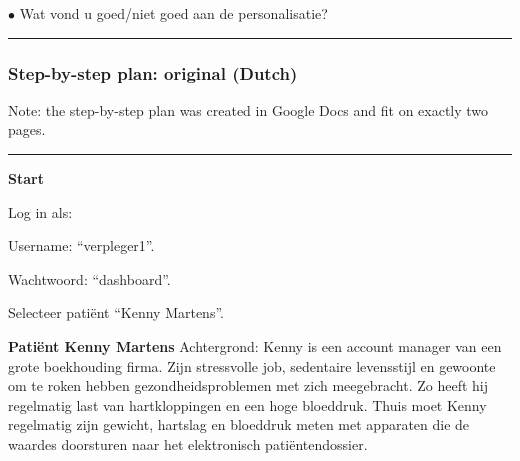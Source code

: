     \noindent \(\bullet\) Wat vond u goed/niet goed aan de personalisatie?\hspace{6pt}\rule{0.3\textwidth}{0.4pt}

    \subsubsection{Step-by-step plan: original (Dutch)}\label{appendix_test_steps}

    Note: the step-by-step plan was created in Google Docs and fit on exactly two pages.

    \vspace{6pt}
    \hrule
    \vspace{6pt}
    \noindent\textbf{Start}
    \vspace{-6pt}
    \begin{myenumerate}
        \item Log in als:
        \begin{myenumerate}
            \item Username: ``verpleger1''.
            \item Wachtwoord: ``dashboard''.
        \end{myenumerate}
        \item Selecteer pati\"{e}nt ``Kenny Martens''.
    \end{myenumerate}

    \noindent\textbf{Pati\"{e}nt Kenny Martens}\newline
    Achtergrond: Kenny is een account manager van een grote boekhouding firma. Zijn stressvolle job, sedentaire levensstijl en gewoonte om te roken hebben gezondheidsproblemen met zich meegebracht. Zo heeft hij regelmatig last van hartkloppingen en een hoge bloeddruk. Thuis moet Kenny regelmatig zijn gewicht, hartslag en bloeddruk meten met apparaten die de waardes doorsturen naar het elektronisch pati\"{e}ntendossier.\medskip

